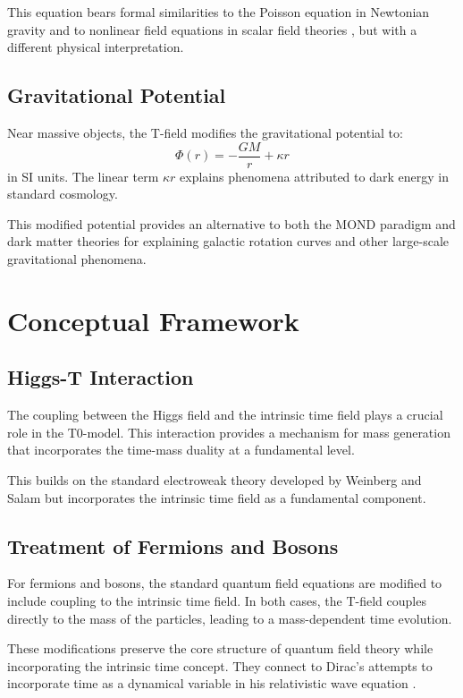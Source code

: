 \documentclass[a4paper,12pt]{article}
\begin{document}
	This equation bears formal similarities to the Poisson equation in Newtonian gravity \cite{Poisson1823} and to nonlinear field equations in scalar field theories \cite{Rajaraman1982}, but with a different physical interpretation.
	
	\subsection{Gravitational Potential}
	Near massive objects, the T-field modifies the gravitational potential to:
	\[
	\Phi(r) = -\frac{GM}{r} + \kappa r
	\]
	in SI units. The linear term $\kappa r$ explains phenomena attributed to dark energy in standard cosmology.
	
	This modified potential provides an alternative to both the MOND paradigm \cite{Milgrom1983} and dark matter theories \cite{Bertone2005} for explaining galactic rotation curves and other large-scale gravitational phenomena.
	
	\section{Conceptual Framework}
	
	\subsection{Higgs-T Interaction}
	The coupling between the Higgs field and the intrinsic time field plays a crucial role in the T0-model. This interaction provides a mechanism for mass generation that incorporates the time-mass duality at a fundamental level.
	
	This builds on the standard electroweak theory developed by Weinberg \cite{Weinberg1967} and Salam \cite{Salam1968} but incorporates the intrinsic time field as a fundamental component.
	
	\subsection{Treatment of Fermions and Bosons}
	For fermions and bosons, the standard quantum field equations are modified to include coupling to the intrinsic time field. In both cases, the T-field couples directly to the mass of the particles, leading to a mass-dependent time evolution.
	
	These modifications preserve the core structure of quantum field theory while incorporating the intrinsic time concept. They connect to Dirac's attempts to incorporate time as a dynamical variable in his relativistic wave equation \cite{Dirac1928}.
	
\end{document}
